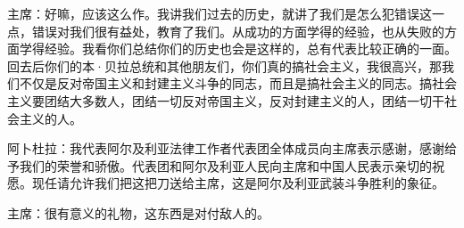 主席：好嘛，应该这么作。我讲我们过去的历史，就讲了我们是怎么犯错误这一点，错误对我们很有益处，教育了我们。从成功的方面学得的经验，也从失败的方面学得经验。我看你们总结你们的历史也会是这样的，总有代表比较正确的一面。回去后你们的本·贝拉总统和其他朋友们，你们真的搞社会主义，我很高兴，那我们不仅是反对帝国主义和封建主义斗争的同志，而且是搞社会主义的同志。搞社会主义要团结大多数人，团结一切反对帝国主义，反对封建主义的人，团结一切干社会主义的人。

阿卜杜拉：我代表阿尔及利亚法律工作者代表团全体成员向主席表示感谢，感谢给予我们的荣誉和骄傲。代表团和阿尔及利亚人民向主席和中国人民表示亲切的祝愿。现任请允许我们把这把刀送给主席，这是阿尔及利亚武装斗争胜利的象征。

主席：很有意义的礼物，这东西是对付敌人的。

